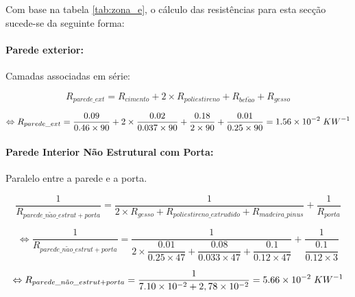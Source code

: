 \documentclass[12pt, a4paper]{article}
\begin{document}
Com base na tabela \ref*{tab:zona_e}, o cálculo das resistências para esta secção sucede-se da seguinte forma:

\paragraph{Parede exterior:}\label{par:zona_e_ext}Camadas associadas em série:

\begin{equation}
	R_{parede\_ext} = R_{cimento} + 2 \times R_{poliestireno} + R_{bet\tilde{a}o} + R_{gesso}
	\label{eq:zona_e_ext_1}
\end{equation}

\begin{equation}
	\Leftrightarrow R_{parede\_ext} =
	\dfrac{0.09}{0.46 \times 90} +
	2 \times \dfrac{0.02}{0.037 \times 90} +
	\dfrac{0.18}{2 \times 90} +
	\dfrac{0.01}{0.25 \times 90} = 1.56 \times 10^{-2} \hspace{1mm} KW^{-1}
	\label{eq:zona_e_ext_2}
\end{equation}

\paragraph{Parede Interior N\~ao Estrutural com Porta:}\label{par:zona_e_int_n_est}Paralelo entre a parede e a porta.

\begin{equation}
    \dfrac{1}{R_{parede\_n\tilde{a}o\_estrut + porta}} =
			\dfrac{1}{
            2 \times R_{gesso} + R_{poliestireno\_extrudido} + R_{madeira\_pinus}
			}
			+
			\dfrac{1}{
				R_{porta}
			}
    \label{eq:zona_e_int_n_est_1}
\end{equation}

\begin{equation}
    \Leftrightarrow \dfrac{1}{R_{parede\_n\tilde{a}o\_estrut + porta}} =
			\dfrac{1}{
            2 \times \dfrac{0.01}{0.25 \times 47} +
            \dfrac{0.08}{0.033 \times 47} +
            \dfrac{0.1}{0.12 \times 47}
        	}
			+
			\dfrac{1}{
            \dfrac{0.1}{0.12 \times 3}
			}
    \label{eq:zona_e_int_n_est_2}
\end{equation}

\begin{equation}
    \Leftrightarrow R_{parede\_n\tilde{a}o\_estrut + porta} =
	\dfrac{1}{
        7.10 \times 10^{-2} + 2,78 \times 10^{-2}
	}
	= 5.66 \times 10^{-2} \hspace{1mm} KW^{-1}
    \label{eq:zona_e_int_n_est_3}
\end{equation}
\end{document}
